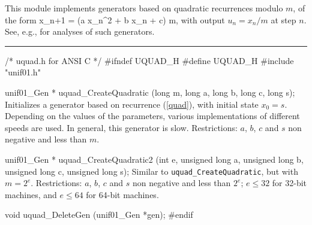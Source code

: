 
This module implements generators based on quadratic recurrences 
modulo $m$, of the form
\eq
  x_{n+1} = (a x_n^2 + b x_n + c) \mod m,          
\endeq
with output $u_n = x_n/m$ at step $n$.
See, e.g., \cite{rEIC87a,rEIC97d,rEMM97a,rKNU98a}
for analyses of such generators.


\bigskip
\hrule
\code
\hide
/* uquad.h for ANSI C */
#ifndef UQUAD_H
#define UQUAD_H
\endhide
#include "unif01.h"


unif01_Gen * uquad_CreateQuadratic (long m, long a, long b, long c, long s);
\endcode
  \tab  Initializes a generator based on recurrence (\ref{quad}),
   with initial state $x_0 = s$.
%
   Depending on the values of the parameters, various implementations 
   of different speeds are used.  In general, this generator
   is slow.  Restrictions: $a$, $b$, $c$ and $s$ non
   negative and less than $m$.
 \endtab
\code


unif01_Gen * uquad_CreateQuadratic2 (int e, unsigned long a,
    unsigned long b, unsigned long c, unsigned long s);
\endcode
  \tab  Similar to {\tt uquad\_CreateQuadratic}, but with $m=2^e$.
   Restrictions: $a$, $b$, $c$ and $s$ non negative and
   less than $2^e$; $e \le 32$ for 32-bit machines,
   and $e \le 64$ for 64-bit machines.
 \endtab


\code

void uquad_DeleteGen (unif01_Gen *gen);
\endcode
 \tab \DelGen
 \endtab
\code
\hide
#endif
\endhide
\endcode
